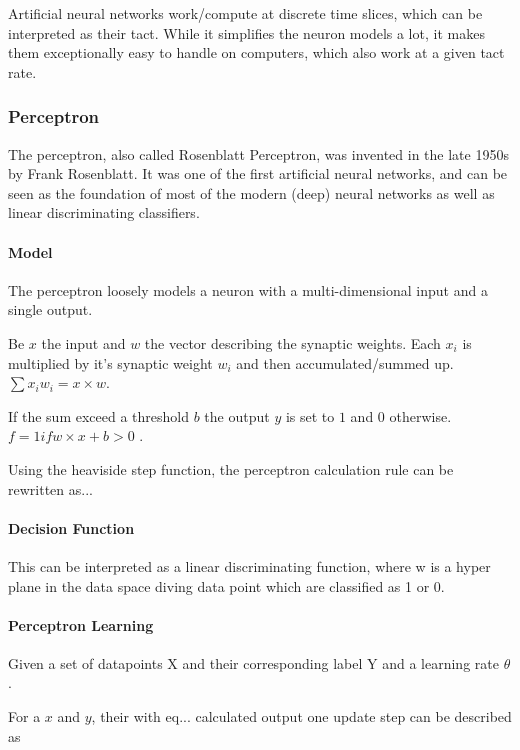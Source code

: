 Artificial neural networks work/compute at discrete time slices, which can be interpreted as their tact.
While it simplifies the neuron models a lot, it makes them exceptionally easy to handle on computers, which also work at a given tact rate.

\subsubsection{Perceptron}

The perceptron, also called Rosenblatt Perceptron, was invented in the late 1950s by Frank Rosenblatt. 
It was one of the first artificial neural networks, and can be seen as the foundation of most of the modern (deep) neural networks as well as linear discriminating classifiers. 

\paragraph{Model}

The perceptron loosely models a neuron with a multi-dimensional input and a single output. 

Be $x$ the input and $w$ the vector describing the synaptic weights. 
Each $x_i$ is multiplied by it's synaptic weight $w_i$ and then accumulated/summed up.
$\sum x_i w_i = x \times w$.

If the sum exceed a threshold $b$ the output $y$ is set to $1$ and $0$ otherwise.
$f = 1 if w \times x + b > 0 $ .

Using the heaviside step function, the perceptron calculation rule can be rewritten as...  

\paragraph{Decision Function}

This can be interpreted as a linear discriminating function, where w is a hyper plane in the data space diving data point which are classified as 1 or 0.

\paragraph{Perceptron Learning}

Given a set of datapoints X and their corresponding label Y and a learning rate $\theta$. 

For a $x$ and $y$, their with eq... calculated output one update step can be described as
 
